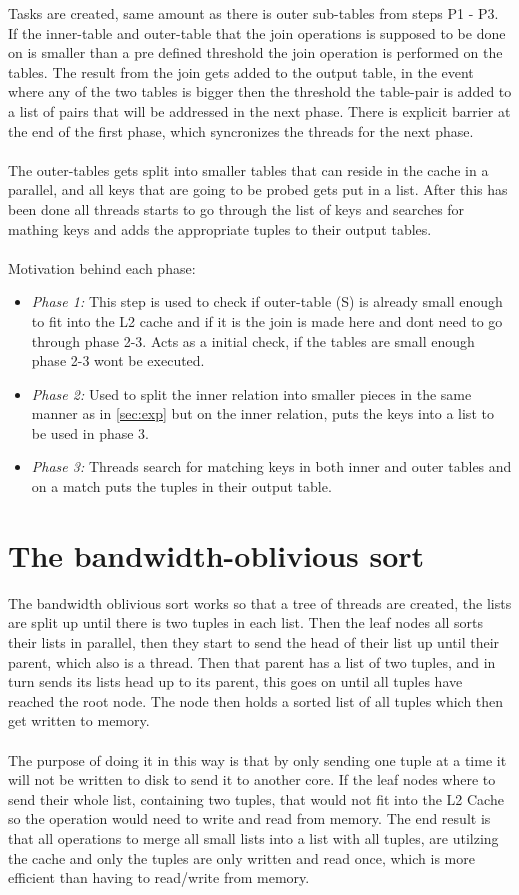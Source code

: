 \documentclass[a4paper,12pt]{article}
\begin{document}
Tasks are created, same amount as there is outer sub-tables from steps P1 - P3. If the inner-table and outer-table that the join operations is supposed to be done on is smaller than a pre defined threshold the join operation is performed on the tables.
The result from the join gets added to the output table, in the event where any of the two tables is bigger then the threshold the table-pair is added to a list of pairs that will be addressed in the next phase.
There is explicit barrier at the end of the first phase, which syncronizes the threads for the next phase.
\\\\
The outer-tables gets split into smaller tables that can reside in the cache in a parallel, and all keys that are going to be probed gets put in a list. 
After this has been done all threads starts to go through the list of keys and searches for mathing keys and adds the appropriate tuples to their output tables.
\\\\
Motivation behind each phase:
\begin{itemize}
 \item \emph{Phase 1:} This step is used to check if outer-table (S) is already small enough to fit into the L2 cache and if it is the join is made here and dont need to go through phase 2-3. Acts as a initial check, if the tables are small enough phase 2-3 wont be executed.
 \item \emph{Phase 2:} Used to split the inner relation into smaller pieces in the same manner as in \ref{sec:exp} but on the inner relation, puts the keys into a list to be used in phase 3.
 \item \emph{Phase 3:} Threads search for matching keys in both inner and outer tables and on a match puts the tuples in their output table.
\end{itemize}

\section{The bandwidth-oblivious sort}
The bandwidth oblivious sort works so that a tree of threads are created, the lists are split up until there is two tuples in each list.
Then the leaf nodes all sorts their lists in parallel, then they start to send the head of their list up until their parent, which also is a thread.
Then that parent has a list of two tuples, and in turn sends its lists head up to its parent, this goes on until all tuples have reached the root node.
The node then holds a sorted list of all tuples which then get written to memory.
\\\\
The purpose of doing it in this way is that by only sending one tuple at a time it will not be written to disk to send it to another core. If the leaf nodes where to send their whole list, containing two tuples, that 
would not fit into the L2 Cache so the operation would need to write and read from memory. 
The end result is that all operations to merge all small lists into a list with all tuples, are utilzing the cache and only the tuples are only written and read once, which is more efficient than having to read/write from memory.
\end{document}
